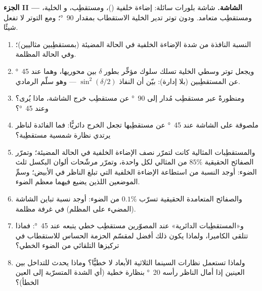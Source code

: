 \begin{problem}
\medskip
\noindent\textbf{الجزء II --- الشاشة.}
شاشة بلورات سائلة: إضاءة خلفية ()، ومستقطِب، و
الخلية، ومستقطِب متعامد. ودون توتر تدير الخلية
الاستقطاب بمقدار \qty{90}{\degree}؛ ومع التوتر لا تفعل شيئًا.
\begin{enumerate}[resume]
  \item النسبة النافذة من شدة الإضاءة الخلفية في
        الحالة المضيئة (بمستقطِبين مثاليين)؛ وفي الحالة المظلمة.
  \item ويجعل توتر وسطي الخلية تسلك سلوك مؤخِّر
        بطور $\delta$ بين محوريها، وهما عند \qty{45}{\degree} عن
        المستقطِبين (بلا إدارة): بيّن أن النفاذ
        $\sin^2(\delta/2)$ --- وهو سلّم الرمادي.
  \item ومنظورةً عبر مستقطِب مُدار إلى \qty{90}{\degree} عن مستقطِب
        خرج الشاشة، ماذا يُرى؟ وعند \qty{45}{\degree}؟
  \item {} ملصوقة على الشاشة عند \qty{45}{\degree} عن
        مستقطِبها تجعل الخرج دائريًّا: فما الفائدة لناظر
        يرتدي نظارة شمسية مستقطِبة؟
  \item والمستقطِبات المثالية كانت لتمرّر نصف الإضاءة الخلفية في
        الحالة المضيئة؛ وتمرّر الصفائح الحقيقية $85\%$ من المثالي لكل واحدة،
        وتمرّر مرشّحات ألوان البكسل ثلث الضوء:
        أوجد النسبة من استطاعة الإضاءة الخلفية التي تبلغ الناظر في الأبيض؛
        وسمِّ الموضعين اللذين يضيع فيهما معظم الضوء.
  \item والصفائح المتعامدة الحقيقية تسرّب $0.1\%$ من الضوء: أوجد نسبة تباين
        الشاشة (المضيء على المظلم) في غرفة مظلمة.
  \item و«المستقطِبات الدائرية» عند المصوّرين مستقطِب خطي
        يتبعه  عند \qty{45}{\degree}: فماذا تتلقى
        الكاميرا، ولماذا يكون ذلك أفضل لمقسّم الحزمة الحساس
        للاستقطاب في تركيزها التلقائي من الضوء
        الخطي؟
  \item ولماذا تستعمل نظارات السينما الثلاثية الأبعاد  لا
        خطيًّا؟ وماذا يحدث للتداخل بين العينين
        إذا أمال الناظر رأسه \qty{20}{\degree} بنظارة خطية
        (أي الشدة المتسرّبة إلى العين الخطأ)؟
\end{enumerate}


\end{problem}
